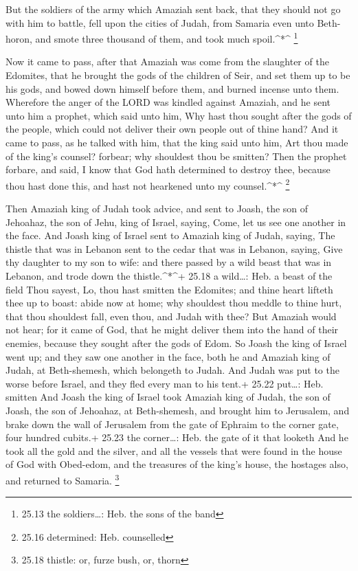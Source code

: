  But the soldiers of the army which Amaziah sent back, that
they should not go with him to battle, fell upon the cities of Judah,
from Samaria even unto Beth-horon, and smote three thousand of them, and
took much spoil.\^{}*\^{} \footnote{25.13 the soldiers\ldots: Heb. the
  sons of the band}

 Now it came to pass, after that Amaziah was come from the
slaughter of the Edomites, that he brought the gods of the children of
Seir, and set them up to be his gods, and bowed down himself before
them, and burned incense unto them.  Wherefore the anger of
the LORD was kindled against Amaziah, and he sent unto him a prophet,
which said unto him, Why hast thou sought after the gods of the people,
which could not deliver their own people out of thine hand?
 And it came to pass, as he talked with him, that the king
said unto him, Art thou made of the king's counsel? forbear; why
shouldest thou be smitten? Then the prophet forbare, and said, I know
that God hath determined to destroy thee, because thou hast done this,
and hast not hearkened unto my counsel.\^{}*\^{} \footnote{25.16
  determined: Heb. counselled}

 Then Amaziah king of Judah took advice, and sent to Joash,
the son of Jehoahaz, the son of Jehu, king of Israel, saying, Come, let
us see one another in the face.  And Joash king of Israel
sent to Amaziah king of Judah, saying, The thistle that was in Lebanon
sent to the cedar that was in Lebanon, saying, Give thy daughter to my
son to wife: and there passed by a wild beast that was in Lebanon, and
trode down the thistle.\^{}*\^{}+ 25.18 a wild\ldots: Heb. a beast of
the field  Thou sayest, Lo, thou hast smitten the Edomites;
and thine heart lifteth thee up to boast: abide now at home; why
shouldest thou meddle to thine hurt, that thou shouldest fall, even
thou, and Judah with thee?  But Amaziah would not hear; for
it came of God, that he might deliver them into the hand of their
enemies, because they sought after the gods of Edom.  So
Joash the king of Israel went up; and they saw one another in the face,
both he and Amaziah king of Judah, at Beth-shemesh, which belongeth to
Judah.  And Judah was put to the worse before Israel, and
they fled every man to his tent.+ 25.22 put\ldots: Heb. smitten
 And Joash the king of Israel took Amaziah king of Judah,
the son of Joash, the son of Jehoahaz, at Beth-shemesh, and brought him
to Jerusalem, and brake down the wall of Jerusalem from the gate of
Ephraim to the corner gate, four hundred cubits.+ 25.23 the
corner\ldots: Heb. the gate of it that looketh  And he took
all the gold and the silver, and all the vessels that were found in the
house of God with Obed-edom, and the treasures of the king's house, the
hostages also, and returned to Samaria. \footnote{25.18 thistle: or,
  furze bush, or, thorn}

